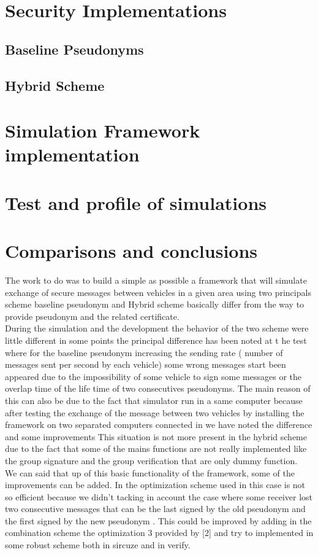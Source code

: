 \documentclass[a4paper,12pt]{article}
\def\baseline{Baseline Pseudonyms~}
\def\hybrid{Hybrid Scheme~}
\begin{document}
\section{Security Implementations}
\subsection{\baseline}
\subsection{\hybrid}
\section{Simulation Framework implementation}

\section{Test and profile of simulations}
\section{Comparisons and conclusions}
The work to do was to build a simple as possible a framework that will simulate exchange of secure messages between vehicles in a given area using two principals scheme baseline pseudonym and Hybrid scheme  basically differ  from the way to provide pseudonym  and the related certificate.\\
During the simulation and the development  the behavior of the two scheme were  little different in some points the principal difference has been noted at t he test where for the baseline  pseudonym increasing the sending rate ( number of messages sent per  second by each vehicle) some wrong messages start been appeared due to the impossibility of some vehicle to sign some messages or the overlap time of the life time of two consecutives pseudonyms. The main reason of this can also be due to the fact that simulator run in a same computer because after testing the exchange of the message between two vehicles by installing the framework on two separated computers connected in we have noted the difference and some improvements
This situation is not more present in the hybrid scheme due to the fact that some of the mains functions are not really implemented like the group signature and the group verification that are only dummy function.\\
We can said that up of this basic functionality of the framework, some of the improvements can be added.  In the optimization scheme used in this case is not so efficient because we didn't tacking in account the case where some receiver lost two consecutive messages that can be the last signed by the old pseudonym and the first signed by the  new pseudonym . This could be improved by adding in the combination scheme the optimization 3 provided by [2] and try to implemented in some robust scheme both in sircuze and in verify.\\
\end{document}
